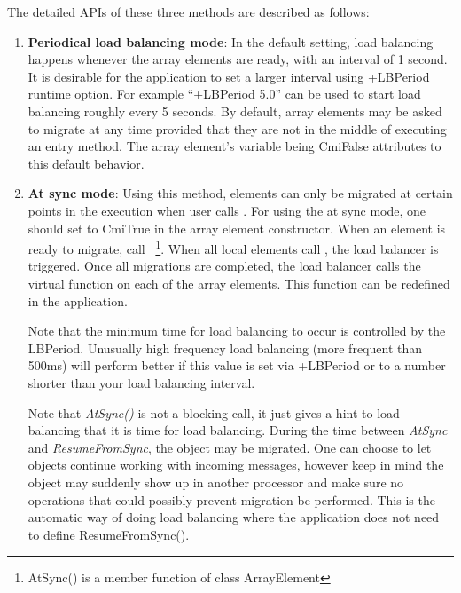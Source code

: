 The detailed APIs of these three methods are described as follows:
%
\begin{enumerate}
%
\item {\bf Periodical load balancing mode}: In the default setting, load
balancing happens whenever the array elements are ready, with an interval of 1
second. It is desirable for the application to set a larger interval using
+LBPeriod runtime option. For example ``+LBPeriod 5.0'' can be used to start load
balancing roughly every 5 seconds. By default, array elements may be asked to
migrate at any time provided that they are not in the middle of executing an
entry method. The array element's variable  being CmiFalse
attributes to this default behavior.
%
\item {\bf At sync mode}: Using this method, elements can only be migrated at
certain points in the execution when user calls . For using the at
sync mode, one should set  to CmiTrue in the array element
constructor.  When an element is ready to migrate, call
~\footnote{AtSync() is a member function of class ArrayElement}.
When all local elements call , the load balancer is triggered.  Once
all migrations are completed, the load balancer calls the virtual function
 on each of the array elements. This
function can be redefined in the application.

Note that the minimum time for  load balancing to occur
is controlled by the LBPeriod.  Unusually high frequency load
balancing (more frequent than 500ms) will perform better if this value
is set via +LBPeriod or  to a number shorter than your load
balancing interval.

Note that {\em AtSync()} is not a blocking call, it just gives a hint to load
balancing that it is time for load balancing. During the time between {\em
AtSync} and {\em ResumeFromSync}, the object may be migrated. One can choose
to let objects continue working with incoming messages, however keep in mind
the object may suddenly show up in another processor and make sure no
operations that could possibly prevent migration be performed. This is the automatic way of doing load balancing where the application does not need to define ResumeFromSync().


\end{enumerate}
